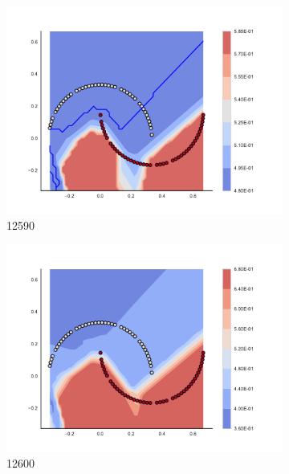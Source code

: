 \begin{figure}[h]
\begin{subfigure}[b]{0.09\textwidth}
    \includegraphics[clip, trim=2.35cm 1.75cm 4.5cm 0cm,width=\textwidth]{img/convergence/12590.pdf}
    \caption{12590}
    \label{fig:convergence_12590}
\end{subfigure}
%
\begin{subfigure}[b]{0.09\textwidth}
    \includegraphics[clip, trim=2.35cm 1.75cm 4.5cm 0cm,width=\textwidth]{img/convergence/12600.pdf}
    \caption{12600}
    \label{fig:convergence_12600}
\end{subfigure}
%
\begin{subfigure}[b]{0.09\textwidth}

\end{subfigure}
\end{figure}
